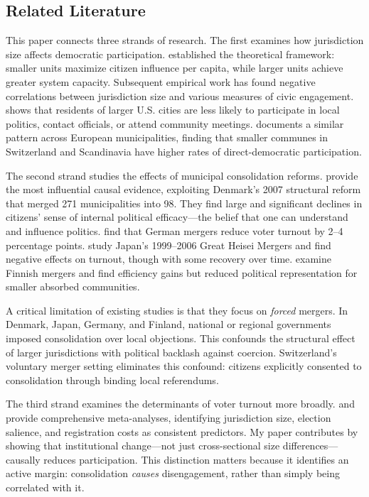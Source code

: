\documentclass[12pt]{article}
\begin{document}
\subsection{Related Literature}

This paper connects three strands of research. The first examines how jurisdiction size affects democratic participation. \citet{dahltufte1973} established the theoretical framework: smaller units maximize citizen influence per capita, while larger units achieve greater system capacity. Subsequent empirical work has found negative correlations between jurisdiction size and various measures of civic engagement. \citet{oliver2000city} shows that residents of larger U.S. cities are less likely to participate in local politics, contact officials, or attend community meetings. \citet{ladner2010size} documents a similar pattern across European municipalities, finding that smaller communes in Switzerland and Scandinavia have higher rates of direct-democratic participation.

The second strand studies the effects of municipal consolidation reforms. \citet{lassen2011jurisdictional} provide the most influential causal evidence, exploiting Denmark's 2007 structural reform that merged 271 municipalities into 98. They find large and significant declines in citizens' sense of internal political efficacy---the belief that one can understand and influence politics. \citet{blesse2016local} find that German mergers reduce voter turnout by 2--4 percentage points. \citet{horiuchi2015municipal} study Japan's 1999--2006 Great Heisei Mergers and find negative effects on turnout, though with some recovery over time. \citet{saarimaa2015efficiency} examine Finnish mergers and find efficiency gains but reduced political representation for smaller absorbed communities.

A critical limitation of existing studies is that they focus on \textit{forced} mergers. In Denmark, Japan, Germany, and Finland, national or regional governments imposed consolidation over local objections. This confounds the structural effect of larger jurisdictions with political backlash against coercion. Switzerland's voluntary merger setting eliminates this confound: citizens explicitly consented to consolidation through binding local referendums.

The third strand examines the determinants of voter turnout more broadly. \citet{geys2006explaining} and \citet{cancela2016explaining} provide comprehensive meta-analyses, identifying jurisdiction size, election salience, and registration costs as consistent predictors. My paper contributes by showing that institutional change---not just cross-sectional size differences---causally reduces participation. This distinction matters because it identifies an active margin: consolidation \textit{causes} disengagement, rather than simply being correlated with it.
\end{document}
